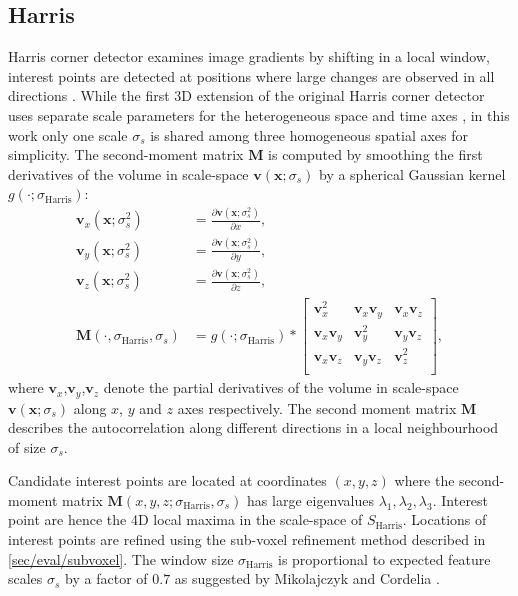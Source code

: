 \subsection{Harris}
Harris corner detector examines image gradients by shifting in a local window, interest points are detected at positions where large changes are observed in all directions \cite{Harris1988}. While the first 3D extension of the original Harris corner detector uses separate scale parameters for the heterogeneous space and time axes \cite{Laptev2005}, in this work only one scale $\sigma_s$ is shared among three homogeneous spatial axes for simplicity.  
The second-moment matrix $\mathbf{M}$ is computed by smoothing the first derivatives of the volume in scale-space $\mathbf{v}(\mathbf{x};\sigma_s)$ by a spherical Gaussian kernel $g(\cdot;\sigma_\textrm{Harris})$: 
\begin{equation}
	\begin{aligned}
		\mathbf{v}_x(\mathbf{x};\sigma^2_s) & = \displaystyle\frac{\partial \mathbf{v}(\mathbf{x};\sigma^2_s)}{\partial x}, \\
		\mathbf{v}_y(\mathbf{x};\sigma^2_s) & = \displaystyle\frac{\partial \mathbf{v}(\mathbf{x};\sigma^2_s)}{\partial y}, \\
		\mathbf{v}_z(\mathbf{x};\sigma^2_s) & = \displaystyle\frac{\partial \mathbf{v}(\mathbf{x};\sigma^2_s)}{\partial z}, \\ 
		\mathbf{M}(\cdot, \sigma_\textrm{Harris}, \sigma_s) & = g(\cdot;\sigma_\textrm{Harris}) \ast \left[
			\begin{array}{ccc}
				\mathbf{v}^2_x & \mathbf{v}_x\mathbf{v}_y & \mathbf{v}_x\mathbf{v}_z \\
				\mathbf{v}_x\mathbf{v}_y & \mathbf{v}_y^2 & \mathbf{v}_y\mathbf{v}_z \\
				\mathbf{v}_x\mathbf{v}_z & \mathbf{v}_y\mathbf{v}_z & \mathbf{v}^2_z \\
			\end{array}
		\right],
	\end{aligned}
	\label{eqn/eval/harris_2ndmoment}
\end{equation}
where $\mathbf{v}_x$,$\mathbf{v}_y$,$\mathbf{v}_z$ denote the partial derivatives of the volume in scale-space $\mathbf{v}(\mathbf{x};\sigma_s)$ along $x$, $y$ and $z$ axes respectively. The second moment matrix $\mathbf{M}$ describes the autocorrelation along different directions in a local neighbourhood of size $\sigma_s$. 

Candidate interest points are located at coordinates $(x,y,z)$ where the second-moment matrix $\mathbf{M}(x,y,z; \sigma_\textrm{Harris}, \sigma_s)$ has large eigenvalues $\lambda_1, \lambda_2, \lambda_3$. Interest point are hence the 4D local maxima in the scale-space of $S_{\textrm{Harris}}$. Locations of interest points are refined using the sub-voxel refinement method described in \ref{sec/eval/subvoxel}. The window size $\sigma_\textrm{Harris}$ is proportional to expected feature scales $\sigma_s$ by a factor of $0.7$ as suggested by Mikolajczyk and Cordelia \cite{Mikolajczyk2004}. 

